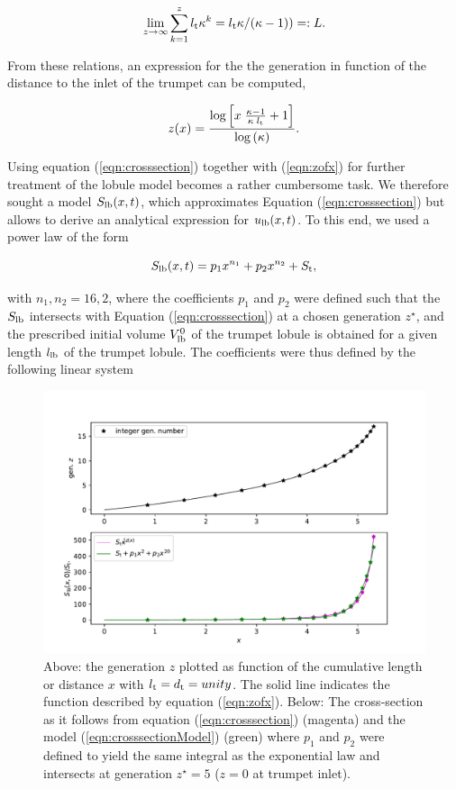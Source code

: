 \begin{equation}
\lim_{z \to \infty}\sum_{k=1}^z l_{\mathrm{t}}\kappa^k = l_{\mathrm{t}}\kappa/(\kappa - 1)) =: L \text{.}
\end{equation}

From these relations, an expression for the the generation in function of the distance to the inlet of the trumpet can be computed,

\begin{equation}\label{eqn:zofx}
z(x) = \frac{\log{\left[x\;\frac{\kappa - 1}{\kappa\;l_{\mathrm{t}}} + 1\right]}}{\log{(\kappa)}}\text{.}
\end{equation}

Using equation (\ref{eqn:crosssection}) together with (\ref{eqn:zofx}) for further treatment of the lobule model becomes a rather cumbersome task.
We therefore sought a model $S_{\mathrm{lb}}(x,t)$, which approximates Equation (\ref{eqn:crosssection}) but allows to derive an analytical expression for $u_{\mathrm{lb}}(x,t)$.
To this end, we used a power law of the form

\begin{equation}\label{eqn:crosssectionModel}
S_{\mathrm{lb}}(x,t) = p_1 x^{n_1} + p_2 x^{n_2} + S_{\mathrm{t}}\text{,}
\end{equation}

with $n_1, n_2 = 16, 2$, where the coefficients $p_1$ and $p_2$ were defined such that the $S_{\mathrm{lb}}$ intersects with Equation (\ref{eqn:crosssection}) at a chosen generation $z^\star$, and the prescribed initial volume $V_{\mathrm{lb}}^0$ of the trumpet lobule is obtained for a given length $l_{\mathrm{lb}}$ of the trumpet lobule.
The coefficients were thus defined by the following linear system

\begin{figure}[tb!]
  \centering
  \includegraphics[width=1.0\textwidth]{figures/trumpet_geometry}
  \caption{Above: the generation $z$ plotted as function of the cumulative length or distance $x$ with $l_{\mathrm{t}} = d_{\mathrm{t}} = unity$. The solid line indicates the function described by equation (\ref{eqn:zofx}). Below: The cross-section as it follows from equation (\ref{eqn:crosssection}) (magenta) and the model (\ref{eqn:crosssectionModel}) (green) where $p_1$ and $p_2$ were defined to yield the same integral as the exponential law and intersects at generation $z^\star = 5$ ($z = 0$ at trumpet inlet).}
  \label{fig:trumpet_geometry}
\end{figure}


